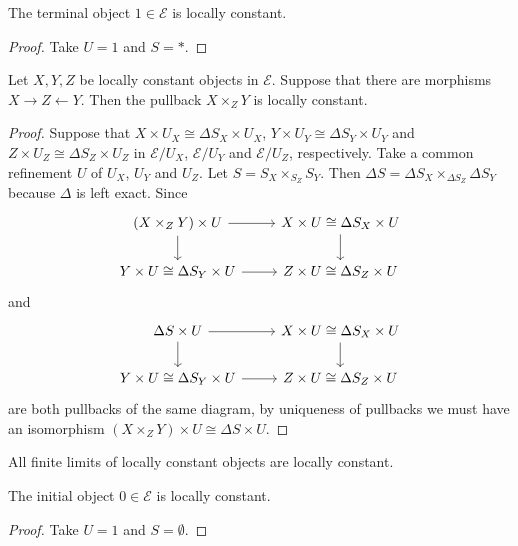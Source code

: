 \begin{lemma}
\label{lemma: terminal object is locally const}
The terminal object $1 \in \mathscr{E}$ is locally constant.
\end{lemma}
\begin{proof}
Take $U = 1$ and $S = *$.
\end{proof}

\begin{lemma}
\label{lemma: pullback of locally const is locally const}
Let $X,Y,Z$ be locally constant objects in $\mathscr{E}$. Suppose that there are morphisms $X \to Z \leftarrow Y$. Then the pullback $X \times_Z Y$ is locally constant.
\end{lemma}
\begin{proof}
Suppose that $X \times U_X \cong \Delta S_X \times U_X$, $Y \times U_Y \cong \Delta S_Y \times U_Y$ and $Z \times U_Z \cong \Delta S_Z \times U_Z$ in $\mathscr{E}/U_X$, $\mathscr{E}/U_Y$ and $\mathscr{E}/U_Z$, respectively. Take a common refinement $U$ of $U_X$, $U_Y$ and $U_Z$. Let $S = S_X \times_{S_Z} S_Y$. Then $\Delta S = \Delta S_X \times_{\Delta S_Z} \Delta S_Y$ because $\Delta$ is left exact. Since
\[ \begin{tikzcd}
 \left( X \times_Z Y \right) \times U \arrow[r] \arrow[d] & X \times U \cong \Delta S_X \times U \arrow[d] \\
 Y \times U \cong \Delta S_Y \times U \arrow[r] & Z \times U \cong \Delta S_Z \times U
\end{tikzcd} \]
and
\[ \begin{tikzcd}
 \Delta S \times U \arrow[r] \arrow[d] & X \times U \cong \Delta S_X \times U \arrow[d] \\
 Y \times U \cong \Delta S_Y \times U \arrow[r] & Z \times U \cong \Delta S_Z \times U
\end{tikzcd} \]
are both pullbacks of the same diagram, by uniqueness of pullbacks we must have an isomorphism $\left( X \times_Z Y \right) \times U \cong \Delta S \times U$.
\end{proof}

\begin{corollary}
All finite limits of locally constant objects are locally constant.
\end{corollary}

\begin{lemma}
\label{lemma: initial object is locally const}
The initial object $0 \in \mathscr{E}$ is locally constant.
\end{lemma}
\begin{proof}
Take $U = 1$ and $S = \emptyset$.
\end{proof}

